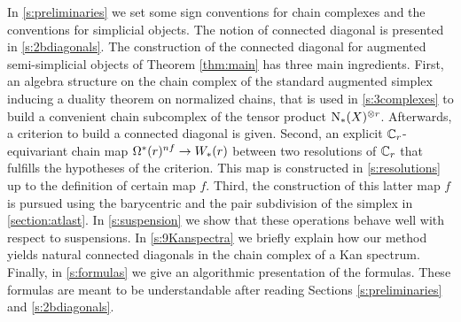 In \cref{s:preliminaries} we set some sign conventions for chain complexes and the conventions for simplicial objects.
The notion of connected diagonal is presented in \cref{s:2bdiagonals}.
The construction of the connected diagonal for augmented semi-simplicial objects of Theorem \ref{thm:main} has three main ingredients.
First, an algebra structure on the chain complex of the standard augmented simplex inducing a duality theorem on normalized chains, that is used in \cref{s:3complexes} to build a convenient chain subcomplex of the tensor product $\operatorname{N}_{*}(X)^{\otimes r}$.
Afterwards, a criterion to build a connected diagonal is given.
Second, an explicit $\mathbb{C}_r$-equivariant chain map $\Omega^*(r)^{nf} \to W_*(r)$ between two resolutions of $\mathbb{C}_r$ that fulfills the hypotheses of the criterion.
This map is constructed in \cref{s:resolutions} up to the definition of certain map $f$.
Third, the construction of this latter map $f$ is pursued using the barycentric and the pair subdivision of the simplex in \cref{section:atlast}.
In \cref{s:suspension} we show that these operations behave well with respect to suspensions.
In \cref{s:9Kanspectra} we briefly explain how our method yields natural connected diagonals in the chain complex of a Kan spectrum.
Finally, in \cref{s:formulas} we give an algorithmic presentation of the formulas.
These formulas are meant to be understandable after reading Sections \ref{s:preliminaries} and \ref{s:2bdiagonals}.